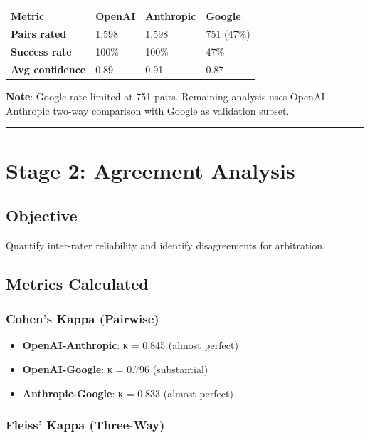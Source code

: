 \documentclass[
  letterpaper,
]{report}
\providecommand{\tightlist}{%
  \setlength{\itemsep}{0pt}\setlength{\parskip}{0pt}}
\begin{document}
\begin{longtable}[]{@{}llll@{}}
\toprule\noalign{}
Metric & OpenAI & Anthropic & Google \\
\midrule\noalign{}
\endhead
\bottomrule\noalign{}
\endlastfoot
\textbf{Pairs rated} & 1,598 & 1,598 & 751 (47\%) \\
\textbf{Success rate} & 100\% & 100\% & 47\% \\
\textbf{Avg confidence} & 0.89 & 0.91 & 0.87 \\
\end{longtable}

\textbf{Note}: Google rate-limited at 751 pairs. Remaining analysis uses
OpenAI-Anthropic two-way comparison with Google as validation subset.

\begin{center}\rule{0.5\linewidth}{0.5pt}\end{center}

\section{Stage 2: Agreement Analysis}\label{stage-2-agreement-analysis}

\subsection{Objective}\label{objective-1}

Quantify inter-rater reliability and identify disagreements for
arbitration.

\subsection{Metrics Calculated}\label{metrics-calculated}

\subsubsection{Cohen's Kappa (Pairwise)}\label{cohens-kappa-pairwise}

\begin{itemize}
\tightlist
\item
  \textbf{OpenAI-Anthropic}: κ = 0.845 (almost perfect)
\item
  \textbf{OpenAI-Google}: κ = 0.796 (substantial)
\item
  \textbf{Anthropic-Google}: κ = 0.833 (almost perfect)
\end{itemize}

\subsubsection{Fleiss' Kappa (Three-Way)}\label{fleiss-kappa-three-way}
\end{document}
